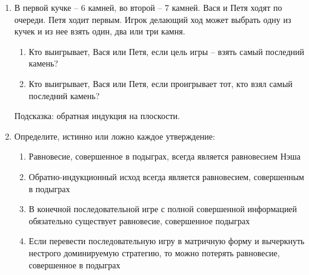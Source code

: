 \documentclass[pdftex,12pt,a4paper]{article}
\begin{document}
\begin{enumerate}
\item 
В первой кучке – 6 камней, во второй – 7 камней. Вася и Петя ходят по очереди. Петя ходит первым.  Игрок делающий ход может выбрать одну из кучек и из нее взять один, два или три камня.
\begin{enumerate}
\item Кто выигрывает, Вася или Петя, если цель игры – взять самый последний камень?
\item Кто выигрывает, Вася или Петя, если проигрывает тот, кто взял самый последний камень?
\end{enumerate}
Подсказка: обратная индукция на плоскости.

\item 
Определите, истинно или ложно каждое утверждение:
\begin{enumerate}
\item Равновесие, совершенное в подыграх, всегда является равновесием Нэша
\item Обратно-индукционный исход всегда является равновесием, совершенным в подыграх
\item В конечной последовательной игре с полной совершенной информацией обязательно существует равновесие, совершенное подыграх
\item Если перевести последовательную игру в матричную форму и вычеркнуть нестрого доминируемую стратегию, то можно потерять равновесие, совершенное в подыграх
\end{enumerate}


\end{enumerate}
\end{document}
